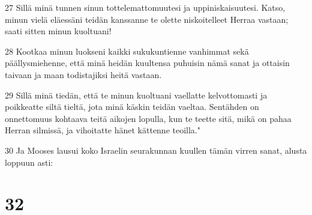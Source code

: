 \par 27 Sillä minä tunnen sinun tottelemattomuutesi ja uppiniskaisuutesi. Katso, minun vielä eläessäni teidän kanssanne te olette niskoitelleet Herraa vastaan; saati sitten minun kuoltuani!
\par 28 Kootkaa minun luokseni kaikki sukukuntienne vanhimmat sekä päällysmiehenne, että minä heidän kuultensa puhuisin nämä sanat ja ottaisin taivaan ja maan todistajiksi heitä vastaan.
\par 29 Sillä minä tiedän, että te minun kuoltuani vaellatte kelvottomasti ja poikkeatte siltä tieltä, jota minä käskin teidän vaeltaa. Sentähden on onnettomuus kohtaava teitä aikojen lopulla, kun te teette sitä, mikä on pahaa Herran silmissä, ja vihoitatte hänet kättenne teoilla."
\par 30 Ja Mooses lausui koko Israelin seurakunnan kuullen tämän virren sanat, alusta loppuun asti:

\chapter{32}

